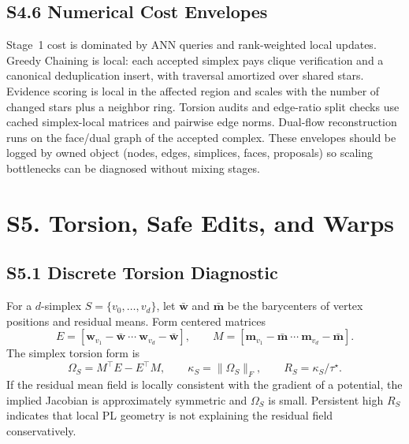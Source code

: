 \documentclass[11pt]{article}
\begin{document}
\subsection*{S4.6 Numerical Cost Envelopes}
Stage~1 cost is dominated by ANN queries and rank-weighted local updates. Greedy Chaining is local: each accepted simplex pays clique verification and a canonical deduplication insert, with traversal amortized over shared stars. Evidence scoring is local in the affected region and scales with the number of changed stars plus a neighbor ring. Torsion audits and edge-ratio split checks use cached simplex-local matrices and pairwise edge norms. Dual-flow reconstruction runs on the face/dual graph of the accepted complex. These envelopes should be logged by owned object (nodes, edges, simplices, faces, proposals) so scaling bottlenecks can be diagnosed without mixing stages.

\section*{S5. Torsion, Safe Edits, and Warps}

\subsection*{S5.1 Discrete Torsion Diagnostic}
For a $d$-simplex $S=\{v_0,\dots,v_d\}$, let $\bar{\mathbf w}$ and $\bar{\mathbf m}$ be the barycenters of vertex positions and residual means. Form centered matrices
\[
E=[\mathbf w_{v_1}-\bar{\mathbf w}\ \cdots\ \mathbf w_{v_d}-\bar{\mathbf w}],\qquad
M=[\mathbf m_{v_1}-\bar{\mathbf m}\ \cdots\ \mathbf m_{v_d}-\bar{\mathbf m}].
\]
The simplex torsion form is
\[
\Omega_S=M^\top E-E^\top M,\qquad \kappa_S=\|\Omega_S\|_F,\qquad R_S=\kappa_S/\tau^\star.
\]
If the residual mean field is locally consistent with the gradient of a potential, the implied Jacobian is approximately symmetric and $\Omega_S$ is small. Persistent high $R_S$ indicates that local PL geometry is not explaining the residual field conservatively.
\end{document}
